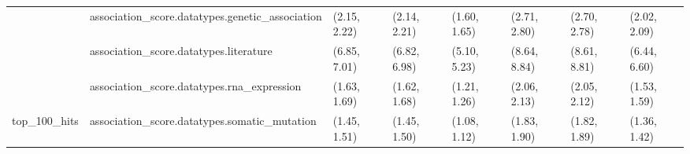 \begin{table}[H]
{\begin{tabular}{llllllll}
 & association\_score.datatypes.genetic\_association & (2.15, 2.22) & (2.14, 2.21) & (1.60, 1.65) & (2.71, 2.80) & (2.70, 2.78) & (2.02, 2.09)\\

 & association\_score.datatypes.literature & (6.85, 7.01) & (6.82, 6.98) & (5.10, 5.23) & (8.64, 8.84) & (8.61, 8.81) & (6.44, 6.60)\\

 & association\_score.datatypes.rna\_expression & (1.63, 1.69) & (1.62, 1.68) & (1.21, 1.26) & (2.06, 2.13) & (2.05, 2.12) & (1.53, 1.59)\\

\multirow{-6}{*}{\raggedright\arraybackslash top\_100\_hits} & association\_score.datatypes.somatic\_mutation & (1.45, 1.51) & (1.45, 1.50) & (1.08, 1.12) & (1.83, 1.90) & (1.82, 1.89) & (1.36, 1.42)\\
\bottomrule
\end{tabular}}
\end{table}
